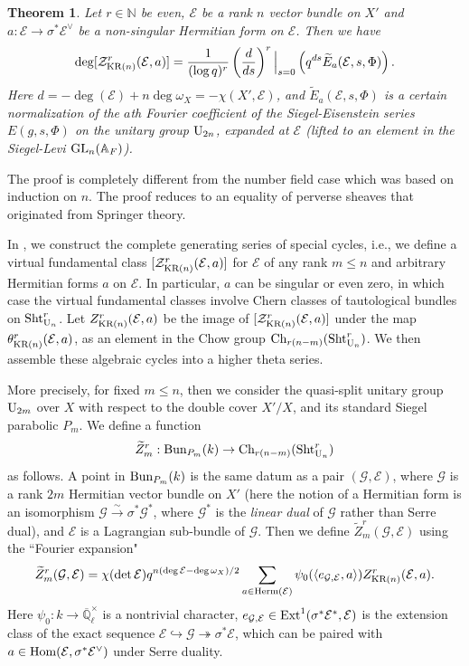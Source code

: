 \documentclass[11pt]{amsart}
\numberwithin{equation}{section}
\theoremstyle{plain}
\newtheorem{theorem}[subsubsection]{Theorem}
\theoremstyle{definition}
\def\AA{\mathbb{A}}
\def\NN{\mathbb{N}}
\def\QQ{\mathbb{Q}}
\newcommand\cE{\mathcal{E}}
\newcommand\cG{\mathcal{G}}
\newcommand\cZ{\mathcal{Z}}
\newcommand{\Bun}{\textup{Bun}}
\newcommand{\Ch}{\textup{Ch}}
\newcommand{\Herm}{\textup{Herm}}
\newcommand\Sht{\textup{Sht}}
\newcommand\Hom{\textup{Hom}}
\newcommand{\Ext}{\textup{Ext}}
\newcommand\GL{\textup{GL}}
\newcommand\Ug{\textup{U}}
\newcommand{\incl}{\hookrightarrow}
\newcommand{\isom}{\stackrel{\sim}{\to}}
\newcommand{\surj}{\twoheadrightarrow}
\newcommand{\Qlbar}{\overline{\QQ}_\ell}
\renewcommand{\j}[1]{\langle{#1}\rangle}
\newcommand{\wt}[1]{\widetilde{#1}}
\renewcommand{\th}{\theta}
\newcommand{\s}{\sigma}
\newcommand{\om}{\omega}
\newcommand\KR{\textup{KR}}
\begin{document}
\begin{theorem} Let $r\in \NN$ be even, $\cE$ be a rank $n$ vector bundle on $X'$ and $a: \cE\to \s^{*}\cE^{\vee}$ be a non-singular Hermitian form on $\cE$. Then we have
\begin{equation*}
\deg [\cZ_{\KR(n)}^r(\cE, a)]=\frac{1}{(\log q)^r}  \left(\dfrac{d}{ds} \right)^r\Big|_{s=0} \left( q^{ds} \wt{E}_{a}(\cE,s,\Phi) \right).
\end{equation*}
Here $d=-\deg(\cE)+n\deg\omega_X =-\chi(X',\cE)$, and $\wt{E}_{a}(\cE,s,\Phi)$ is a certain normalization of the $a$th Fourier coefficient of the Siegel-Eisenstein series $E(g,s,\Phi)$ on the unitary group $\Ug_{2n}$, expanded at $\cE$ (lifted to an element in the Siegel-Levi $\GL_{n}(\AA_{F})$).
\end{theorem}

The proof is completely different from the number field case which was based on induction on $n$. The proof reduces to an equality of perverse sheaves that originated from Springer theory.


In \cite{FYZ2}, we construct the complete generating series of special cycles, i.e., we define a virtual fundamental class $[\cZ_{\KR(n)}^r(\cE, a)]$ for $\cE$ of any rank $m\le n$ and arbitrary Hermitian forms $a$ on $\cE$. In particular, $a$ can be singular or even zero, in which case the virtual  fundamental classes involve Chern classes of tautological bundles on $\Sht^{r}_{\Ug_{n}}$.   Let $Z_{\KR(n)}^{r}(\cE,a)$ be the image of $[\cZ_{\KR(n)}^r(\cE, a)]$ under the map $\th^{r}_{\KR(n)}(\cE,a)$, as an element in the Chow group $\Ch_{r(n-m)}(\Sht^{r}_{\Ug_{n}})$. We then assemble these algebraic cycles into a higher theta series. 

More precisely, for fixed $m\le n$, then we consider the quasi-split unitary group $\Ug_{2m}$ over $X$ with respect to the double cover $X'/X$, and its standard Siegel parabolic $P_m$. We define a function
\begin{equation*}
\wt Z^{r}_{m}: \Bun_{P_{m}}(k)\to \Ch_{r(n-m)}(\Sht^{r}_{\Ug_{n}})
\end{equation*}
as follows. A point in $\Bun_{P_{m}}(k)$ is the same datum as a pair  $(\cG,\cE)$, where $\cG$ is a rank $2m$ Hermitian vector bundle on $X'$ (here the notion of a Hermitian form is an isomorphism $\cG\isom \s^{*}\cG^{*}$, where $\cG^{*}$ is the {\em linear dual}  of $\cG$ rather than Serre dual), and $\cE$ is a Lagrangian sub-bundle of $\cG$. Then we define $\wt Z^{r}_{m}(\cG,\cE) $ using the ``Fourier expansion" 
\begin{equation*}
\wt Z^{r}_{m}(\cG,\cE) =\chi(\det\cE)q^{n(\deg \cE-\deg\om_{X}) /2}\sum_{a\in \Herm(\cE)}\psi_{0}(\j{e_{\cG,\cE}, a})Z^{ r}_{\KR(n)}(\cE, a).
\end{equation*}
Here $\psi_{0}:k\to \Qlbar^{\times}$ is a nontrivial character, $e_{\cG,\cE}\in \Ext^{1}(\s^{*}\cE^{*}, \cE)$ is the extension class of the exact sequence $\cE\incl \cG\surj \s^{*}\cE$, which can be paired with $a\in \Hom(\cE,\s^{*}\cE^{\vee})$ under Serre duality. 
\end{document}
